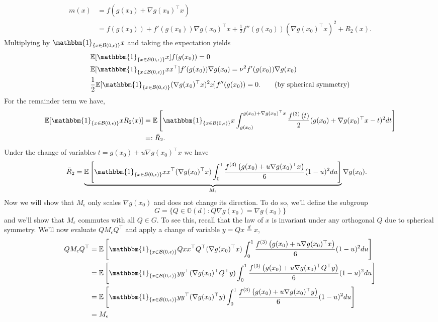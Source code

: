 \documentclass[11pt]{article}
\begin{document}
\begin{align*}
    m(x) &= f\left(g(x_0) + \nabla g(x_0)^{\top}x\right) \\
    &= f(g(x_0)) + f'(g(x_0))\nabla g(x_0)^{\top}x + \frac{1}{2}f''(g(x_0))(\nabla g(x_0)^{\top}x)^2 + R_2(x).
\end{align*}
Multiplying by $\mathbbm{1}_{\{x \in \mathcal{B}(0, \epsilon)\}}x$ and taking the expectation yields
\begin{align*}
    &\mathbb{E}[\mathbbm{1}_{\{x \in \mathcal{B}(0, \epsilon)\}}x]f(g(x_0)) = 0 \\
    &\mathbb{E}[\mathbbm{1}_{\{x \in \mathcal{B}(0, \epsilon)\}}xx^{\top}]f'(g(x_0))\nabla g(x_0) = \nu^2f'(g(x_0))\nabla g(x_0) \\
    & \frac{1}{2}\mathbb{E}[\mathbbm{1}_{\{x \in \mathcal{B}(0, \epsilon)\}}(\nabla g(x_0)^{\top}x)^2x]f''(g(x_0)) = 0. \tag{by spherical symmetry}
\end{align*}
For the remainder term we have,
\begin{align*}
    \mathbb{E}[\mathbbm{1}_{\{x \in \mathcal{B}(0, \epsilon)\}}xR_2(x)] &= \mathbb{E}\left[\mathbbm{1}_{\{x \in \mathcal{B}(0, \epsilon)\}}x\int_{ g(x_0)}^{ g(x_0) + \nabla g(x_0)^{\top}x}\frac{f^{(3)}\left(t\right)}{2}( g(x_0) + \nabla  g(x_0)^{\top}x - t)^2dt\right] \\
    &=: \bar R_2.
\end{align*}
Under the change of variables $t =  g(x_0) + u\nabla g(x_0)^{\top}x$ we have
\begin{align*}
    \bar{R}_2 &= \underbrace{\mathbb{E}\left[\mathbbm{1}_{\{x \in \mathcal{B}(0, \epsilon)\}}xx^{\top}(\nabla  g(x_0)^{\top}x)\int_{0}^{1}\frac{f^{(3)}\left( g(x_0) + u\nabla g(x_0)^{\top}x\right)}{6}(1-u)^2du\right]}_{M_{\epsilon}}\nabla  g(x_0).
\end{align*}
Now we will show that $M_{\epsilon}$ only scales $\nabla g(x_0)$ and does not change its direction. To do so, we'll define the subgroup
\[G = \{Q \in \mathbb{O}(d) : Q\nabla g(x_0) = \nabla g(x_0)\}\]
and we'll show that $M_\epsilon$ commutes with all $Q \in G$. To see this, recall that the law of $x$ is invariant under any orthogonal $Q$ due to spherical symmetry. We'll now evaluate $QM_\epsilon Q^{\top}$ and apply a change of variable $y = Qx \overset{d}= x$,
\begin{align*}
    QM_\epsilon Q^{\top} &= \mathbb{E}\left[\mathbbm{1}_{\{x \in \mathcal{B}(0, \epsilon)\}}Qxx^{\top}Q^{\top}(\nabla  g(x_0)^{\top}x)\int_{0}^{1}\frac{f^{(3)}\left( g(x_0) + u\nabla g(x_0)^{\top}x\right)}{6}(1-u)^2du\right] \\
    &= \mathbb{E}\left[\mathbbm{1}_{\{x \in \mathcal{B}(0, \epsilon)\}}yy^{\top}(\nabla  g(x_0)^{\top}Q^{\top}y)\int_{0}^{1}\frac{f^{(3)}\left( g(x_0) + u\nabla g(x_0)^{\top}Q^{\top}y\right)}{6}(1-u)^2du\right] \\
    &= \mathbb{E}\left[\mathbbm{1}_{\{x \in \mathcal{B}(0, \epsilon)\}}yy^{\top}(\nabla  g(x_0)^{\top}y)\int_{0}^{1}\frac{f^{(3)}\left( g(x_0) + u\nabla g(x_0)^{\top}y\right)}{6}(1-u)^2du\right] \\
    &= M_\epsilon
\end{align*}
\end{document}
